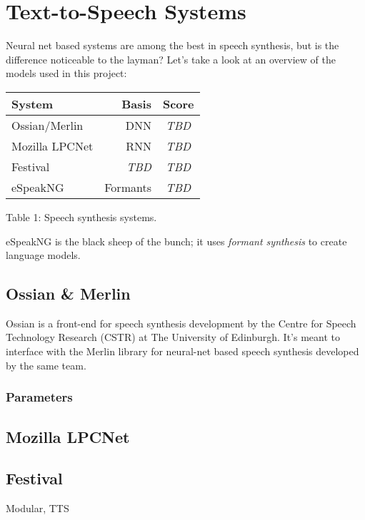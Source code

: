 \documentclass[11pt,a4paper]{article}
\begin{document}
\section{Text-to-Speech Systems}\label{sect:dnn}
Neural net based systems are among the best in speech synthesis, but is the difference noticeable to the layman? Let's take a look at an overview of the models used in this project: %
\begin{center}
	\begin{tabular}{|l|r|c|}
		\hline \bf System & \bf Basis & \bf Score \\ \hline
		Ossian/Merlin & DNN & \textit{TBD} \\
		Mozilla LPCNet & RNN & \textit{TBD} \\
		Festival & \textit{TBD} & \textit{TBD} \\
		eSpeakNG & Formants & \textit{TBD} \\
		\hline
	\end{tabular}

\label{font-table}Table 1: Speech synthesis systems.
\end{center}

eSpeakNG is the black sheep of the bunch; it uses \textit{formant synthesis} to create language models.

\subsection{Ossian \& Merlin}\label{ssec:ossian}
Ossian is a front-end for speech synthesis development by the Centre for Speech Technology Research (CSTR) at The University of Edinburgh. It's meant to interface with the Merlin library for neural-net based speech synthesis developed by the same team.


\subsubsection{Parameters}

\subsection{Mozilla LPCNet}\label{ssec:lpcnet}

\subsection{Festival}\label{ssec:festival}
Modular, TTS
\end{document}
